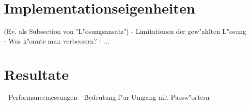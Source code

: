 \begin{refsection}
\section{Implementationseigenheiten}

(Ev. als Subsection von "L"osungsansatz")
- Limitationen der gew"ahlten L"osung
- Was k"onnte man verbessern?
- ...

\section{Resultate}

- Performancemessungen
- Bedeutung f"ur Umgang mit Passw"ortern

\printbibliography[heading=subbibliography]
\end{refsection}
